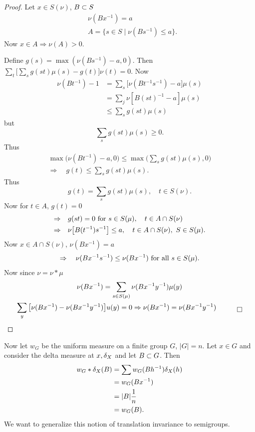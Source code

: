 \begin{proof} Let $x \in S(\nu)$, $B \subset S$
\[
\begin{aligned}
       &\nu(Bx^{-1}) = a                           \\
       &A = \{ s \in S \mid \nu(B s^{-1}) \le a \}.
\end{aligned}
\]
Now $x \in A \Rightarrow \nu(A) > 0$.

     Define $g(s) = \max (\nu(Bs^{-1}) - a, 0)$.  Then $\sum\limits_t
\bigg[ \sum\limits_s g(st) \mu(s) - g(t) \bigg] \nu(t) = 0$.  Now
\[
\begin{aligned}
       \nu(Bt^{-1}) - 1 &= \sum_s \big[
               \nu(Bt^{-1}s^{-1}) - a \big] \mu(s)             \\
       &= \sum_j \nu [B(st)^{-1} - a] \mu(s)                   \\
       &\le \sum_s g(st) \mu(s)
\end{aligned}
\]
but
\[
     \sum_s g(st) \mu(s) \ge 0.
\]
Thus
\[
\begin{gathered}
       \max \big( \nu(B t^{-1}) - a,0 \big)
               \le \max \bigg( \sum_s g(st) \mu(s),0 \bigg)    \\
       \Rightarrow \quad g(t) \le \sum_s g(st) \mu(s).
\end{gathered}
\]
Thus
\[
     g(t) = \sum_s g(st) \mu(s), \quad t \in S(\nu).
\]
Now for $t \in A$, $g(t) = 0$
\[
\begin{aligned}
       \Rightarrow &\quad g(st) = 0 \hbox{ for } s \in S(\mu), \quad
                    t \in A \cap S(\nu)                        \\
       \Rightarrow &\quad \nu \big[ B(t^{-1}) s^{-1} \big]
               \le a, \quad t \in A \cap S(\nu), \ S \in S(\mu).
\end{aligned}
\]
Now $x \in A \cap S(\nu)$, $\nu(Bx^{-1}) = a$
\[
     \Rightarrow \quad \nu(Bx^{-1}s^{-1}) \le \nu(Bx^{-1})
          \hbox{ for all } s \in S(\mu).
\]
Now since $\nu = \nu * \mu$
\[
\begin{gathered}
       \nu(Bx^{-1}) = \sum_{s \in S(\mu)} \nu(Bx^{-1}y^{-1}) \mu(y) \\
       \sum_y \big[ \nu(Bx^{-1}) - \nu(Bx^{-1}y^{-1}) \big] u(y)
               = 0 \Rightarrow \nu(Bx^{-1}) = \nu(Bx^{-1}y^{-1}) \quad \qed
\end{gathered}
\]
\end{proof}

Now let $w_G$ be the uniform measure on a finite group $G$,
$|G| = n$.  Let $x \in G$ and consider the delta measure at $x,\delta_X$
and let $B \subset G$.  Then
\[
\begin{aligned}
       w_G * \delta_X(B) &= \sum w_G (Bh^{-1}) \delta_X(h)           \\
       &= w_G(Bx^{-1})                                         \\
       &= |B| \frac{1}{n}                                      \\
       &= w_G(B).
\end{aligned}
\]
We want to generalize this notion of translation invariance to
semigroups.

